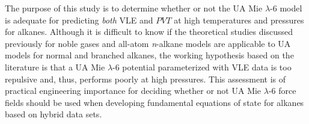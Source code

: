 \documentclass[preprint,letterpaper,floatfix,citeautoscript,aip,jcp]{revtex4-1}
\begin{document}

The purpose of this study is to determine whether or not the UA Mie $\lambda$-6 model is adequate for predicting \textit{both} VLE and $PVT$ at high temperatures and pressures for alkanes. Although it is difficult to know if the theoretical studies discussed previously for noble gases and all-atom \textit{n}-alkane models are applicable to UA models for normal and branched alkanes, the working hypothesis based on the literature is that a UA Mie $\lambda$-6 potential parameterized with VLE data is too repulsive and, thus, performs poorly at high pressures. 
This assessment is of practical engineering importance for deciding whether or not UA Mie $\lambda$-6 force fields should be used when developing fundamental equations of state for alkanes based on hybrid data sets.




%
%




\end{document}
